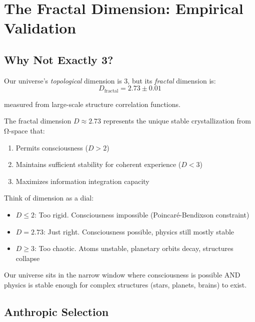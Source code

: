 \section{The Fractal Dimension: Empirical Validation}

\subsection{Why Not Exactly 3?}

Our universe's \textit{topological} dimension is 3, but its \textit{fractal} dimension is:
\begin{equation}
D_{\text{fractal}} = 2.73 \pm 0.01
\end{equation}

measured from large-scale structure correlation functions.

\begin{prop}\label{prop:optimal-dimension}
The fractal dimension $D \approx 2.73$ represents the unique stable crystallization from Ω-space that:
\begin{enumerate}
\item Permits consciousness ($D > 2$)
\item Maintains sufficient stability for coherent experience ($D < 3$)
\item Maximizes information integration capacity
\end{enumerate}
\end{prop}

\begin{intuitive}
Think of dimension as a dial:
\begin{itemize}
\item $D \leq 2$: Too rigid. Consciousness impossible (Poincaré-Bendixson constraint)
\item $D = 2.73$: Just right. Consciousness possible, physics still mostly stable
\item $D \geq 3$: Too chaotic. Atoms unstable, planetary orbits decay, structures collapse
\end{itemize}

Our universe sits in the narrow window where consciousness is possible AND physics is stable enough for complex structures (stars, planets, brains) to exist.
\end{intuitive}

\subsection{Anthropic Selection}

